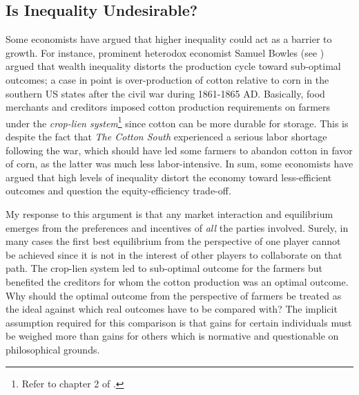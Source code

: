 \documentclass[12pt]{article}
\newcommand{\1}{\mathbbm 1}
\begin{document}
	    
	    
	    \subsection{Is Inequality Undesirable?}
	    
	    
	    
	    Some economists have argued that higher inequality could act as a barrier to growth. For instance, prominent heterodox economist Samuel Bowles (see \cite{bowles2012new}) argued that wealth inequality distorts the production cycle toward sub-optimal outcomes; a case in point is over-production of cotton relative to corn in the southern US states after the civil war during 1861-1865 AD. Basically, food merchants and creditors imposed cotton production requirements on farmers under the \textit{crop-lien system}\footnote{Refer to chapter 2 of \cite{bowles2012new}.} since cotton can be more durable for storage. This is despite the fact that \textit{The Cotton South} experienced a serious labor shortage following the war, which should have led some farmers to abandon cotton in favor of corn, as the latter was much less labor-intensive. In sum, some economists have argued that high levels of inequality distort the economy toward less-efficient outcomes and question the equity-efficiency trade-off. 
	    
	    My response to this argument is that any market interaction and equilibrium emerges from the preferences and incentives of \textit{all} the parties involved. Surely, in many cases the first best equilibrium from the perspective of one player cannot be achieved since it is not in the interest of other players to collaborate on that path. The crop-lien system led to sub-optimal outcome for the farmers but benefited the creditors for whom the cotton production was an optimal outcome. Why should the optimal outcome from the perspective of farmers be treated as the ideal against which real outcomes have to be compared with? The implicit assumption required for this comparison is that gains for certain individuals must be weighed more than gains for others which is normative and questionable on philosophical grounds.
	    
\end{document}
